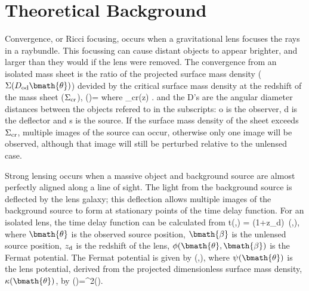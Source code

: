 \documentclass[useAMS,usenatbib]{mn2e}
\begin{document}
\section{Theoretical Background}
\label{sec:theory}



Convergence, or Ricci focusing, occurs when a gravitational lens focuses the rays in a raybundle.
This focussing can cause distant objects to appear brighter, and larger than they would if the lens
 were removed.
The convergence from an isolated mass sheet is the ratio of the projected surface mass density
($\Sigma(D_{\mathrm{od}}\bmath{\theta})$) devided by the critical surface mass density at the redshift of the mass sheet ($\Sigma_{\rm cr}$),
\be
\kappa(\bmath{\theta})= 
\ee
where 
\be \label{eq:sigcrit} 
\Sigma_{\rm cr}(z) \equiv {}.
\ee
and the D's are the angular diameter distances between the objects refered to in the subscripts: o is the observer, d is the deflector and s is the source. If the surface mass density of the sheet exceeds $\Sigma_{\rm cr}$, multiple images of the source can
occur, otherwise only one image will be observed, although that image will still be perturbed
relative to the unlensed case.

Strong lensing occurs when a massive object and background source are almost perfectly
aligned along a line of sight. The light from the background source is deflected by the
lens galaxy; this deflection allows multiple images of the background source to form
at stationary points of the time delay function. For an isolated lens, the time delay
function can be calculated from
\be \label{eq:T} 
\Delta t(\bmath{\theta},\bmath{\beta}) =   (1+z_{\rm d})\, \phi(\bmath{\theta},\bmath{\beta}),
\ee
where $\bmath{\theta}$ is the observed source position, $\bmath{\beta}$ is the 
unlensed source position, $z_{\rm d}$ is the redshift of the lens, $\phi(\bmath{\theta},\bmath{\beta})$ is
the Fermat potential. The Fermat potential is given by
\be \label{eq:FP}
\phi(\bmath{\theta},\bmath{\beta})\equiv {}, 
\ee
where $\psi(\bmath{\theta})$ is the lens potential, derived from the projected dimensionless
surface mass density, $\kappa(\bmath{\theta})$, by 
\be \label{eq:psikappa}
\kappa(\bmath{\theta})=\nabla^2\psi(\bmath{\theta}).
\ee
\end{document}
